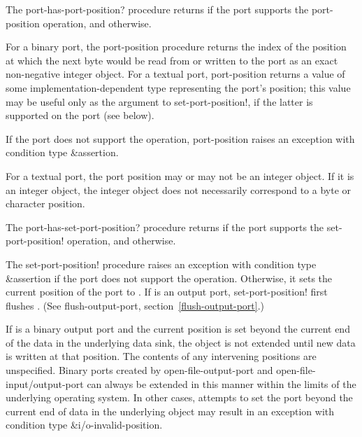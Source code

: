 \begin{entry}{%
}

The {\cf port-has-port-position?} procedure returns \schtrue{} if the
port supports the {\cf port-position} operation, and \schfalse{}
otherwise.

For a binary port, the {\cf port-position} procedure returns the index
of the position at which the next byte would be read from or written
to the port as an exact non-negative integer object.  For a textual
port, {\cf port-position} returns a value of some implementation-dependent
type representing the port's position; this value may be useful only as
the  argument to {\cf set-port-position!}, if the latter is
supported on the port (see below).

If the port does not support the operation, {\cf port-position} raises
an exception with condition type {\cf\&assertion}.

\begin{note}
  For a textual port, the port position may or may not be an integer
  object.  If it is an integer object, the integer object does not
  necessarily correspond to a byte or character position.
\end{note}
\end{entry}   

\begin{entry}{%
}

   
The {\cf port-has-set-port-position?} procedure returns \schtrue{} if the port
supports the {\cf set-port-position!} operation, and \schfalse{}
otherwise.
   
The {\cf set-port-position!} procedure raises an
exception with condition type {\cf\&assertion}
if the port does not support the operation.
Otherwise, it sets the current position
of the port to .  If  is an output
port, {\cf set-port-position!} first flushes .  (See {\cf
  flush-output-port}, section~\ref{flush-output-port}.)

If  is a binary output port and the current position is set
beyond the current end of the data in the underlying data sink, the object is
not extended until new data is written at that position.
The contents of any intervening positions are unspecified.
Binary ports created by {\cf open-file-output-port} and
{\cf open-file-input/output-port} can always be extended in this manner
within the limits of the underlying operating system.
In other cases, attempts to set the port beyond the current end of data
in the underlying object may result in an exception with condition
type {\cf\&i/o-invalid-position}.
\end{entry}

